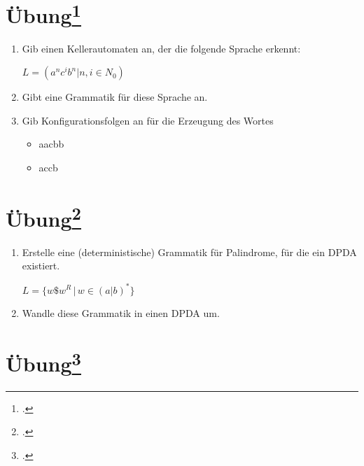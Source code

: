 \documentclass{lehramt-informatik-aufgabe}
\begin{document}
%

\section{Übung\footcite[Seite 25]{theo:fs:2}}

\begin{enumerate}
\item Gib einen Kellerautomaten an, der die folgende Sprache erkennt:

$L = (a^n c^i b^n | n, i \in N_0)$

\item Gibt eine Grammatik für diese Sprache an.

\item Gib Konfigurationsfolgen an für die Erzeugung des Wortes

\begin{itemize}
\item aacbb
\item accb
\end{itemize}

\end{enumerate}

%

\section{Übung\footcite[Seite 34]{theo:fs:2}}

\begin{enumerate}
\item Erstelle eine (deterministische) Grammatik für Palindrome, für die
ein DPDA existiert.

$L = \{ w \$ w^R \, | \, w \in (a|b)^* \}$

\item Wandle diese Grammatik in einen DPDA um.
\end{enumerate}

%

\section{Übung\footcite[Seite 37]{theo:fs:2}}
\end{document}
